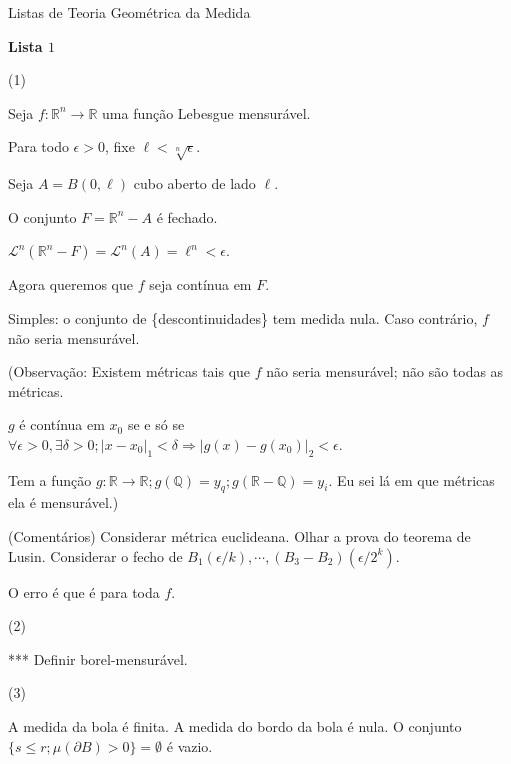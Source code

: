 \documentclass[12pt]{article}
\begin{document}
\Large

\begin{center}
Listas de Teoria Geom\'etrica da Medida
\end{center}

\normalsize

\textbf{Lista $1$}

\vspace{3mm}

(1)

Seja $f : \mathbb{R}^n \to \mathbb{R}$ uma fun\c{c}\~ao Lebesgue mensur\'avel.

Para todo $\epsilon > 0$, fixe $\ell < \sqrt[n]{\epsilon}$.

Seja $A = B(0, \ell)$ cubo aberto de lado $\ell$.

O conjunto $F = \mathbb{R}^n - A$ \'e fechado.

$\mathcal{L}^n(\mathbb{R}^n - F) = \mathcal{L}^n(A) = \ell^n < \epsilon$.

Agora queremos que $f$ seja cont\'inua em $F$.

Simples: o conjunto de \{descontinuidades\} tem medida nula. Caso contr\'ario, $f$ n\~ao seria mensur\'avel.

(Observa\c{c}\~ao: Existem m\'etricas tais que $f$ n\~ao seria mensur\'avel; n\~ao s\~ao todas as m\'etricas.

$g$ \'e cont\'inua em $x_0$ se e s\'o se $\forall \epsilon > 0, \exists \delta > 0 ; |x - x_0|_1 < \delta \Rightarrow |g(x) - g(x_0)|_2 < \epsilon$.

Tem a fun\c{c}\~ao $g: \mathbb{R} \to \mathbb{R} ; g(\mathbb{Q}) = y_q ; g(\mathbb{R} - \mathbb{Q}) = y_i$. Eu sei l\'a em que m\'etricas ela \'e mensur\'avel.)

\vspace{3mm}

(Coment\'arios) Considerar m\'etrica euclideana. Olhar a prova do teorema de Lusin. Considerar o fecho de $B_1(\epsilon/k),\cdots,(B_3 - B_2)(\epsilon/2^k)$.

O erro \'e que \'e para toda $f$.

\vspace{3mm}

(2)

*** Definir borel-mensur\'avel.

\vspace{3mm}

(3)

A medida da bola \'e finita. A medida do bordo da bola \'e nula. O conjunto $\{ s \le r ; \mu(\partial B) > 0 \} = \emptyset$ \'e vazio.
\end{document}
